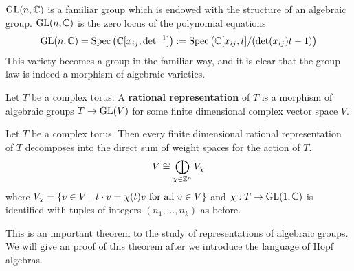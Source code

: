 \documentclass[12pt]{article}
\begin{document}
\begin{example}
    $\operatorname{GL}(n,\mathbb{C})$ is a familiar group which is endowed with the structure of an algebraic group.
    $\operatorname{GL}(n,\mathbb{C})$ is the zero locus of the polynomial equations
    \begin{align*}
        \operatorname{GL}(n,\mathbb{C}) = \operatorname{Spec} \big(\mathbb{C}[x_{ij},{\det}^{-1}]\big) := \operatorname{Spec}\big(\mathbb{C}[x_{ij},t]/(\det(x_{ij})t-1)\big)
    \end{align*} This variety becomes a group in the familiar way,
    and it is clear that the group law is indeed a morphism of algebraic varieties.
\end{example}

\begin{definition}
    Let $T$ be a complex torus. A \textbf{rational representation} of $T$ is a morphism of algebraic groups
    $T\to \operatorname{GL}(V)$ for some finite dimensional complex vector space $V$.
\end{definition}


\begin{theorem}\label{thm:ratrep}
    Let $T$ be a complex torus.
    Then every finite dimensional rational representation of $T$ 
    decomposes into the direct sum of weight spaces for the action of $T$.
    \begin{align*}
        V \cong \bigoplus_{\chi\in \mathbb{Z}^n} V_\chi
    \end{align*} where $V_\chi = \{v\in V \ \vert \  t\cdot v = \chi(t)v \text{ for all $v\in V$}\}$
    and $\chi:T\to\operatorname{GL}(1,\mathbb{C})$ is identified with tuples of integers $(n_1,\ldots, n_k)$ as before.
\end{theorem}
This is an important theorem to the study of representations of algebraic groups.
We will give an proof of this theorem after we introduce the language of Hopf algebras.
\end{document}
